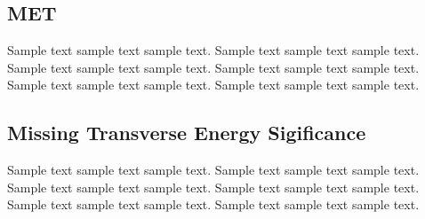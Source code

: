 \subsection{MET}
\label{sec:met}
Sample text sample text sample text. Sample text sample text sample text.
Sample text sample text sample text. Sample text sample text sample text.
Sample text sample text sample text. Sample text sample text sample text.
\subsection{Missing Transverse Energy Sigificance}
\label{sec:met_sig}
Sample text sample text sample text. Sample text sample text sample text.
Sample text sample text sample text. Sample text sample text sample text.
Sample text sample text sample text. Sample text sample text sample text.

